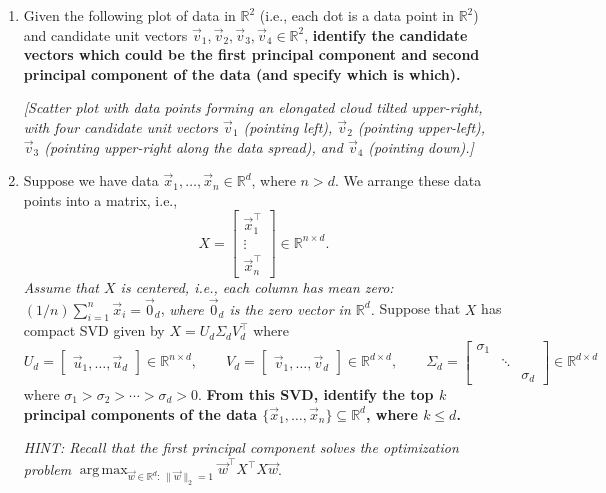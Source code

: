 \documentclass[10pt]{article}
\newcommand{\RR}{\mathbb{R}}
\DeclareMathOperator*{\argmax}{arg\,max}
\begin{document}
\begin{enumerate}[label=(\alph*)]
\item Given the following plot of data in $\RR^2$ (i.e., each dot is a data point in $\RR^2$) and candidate unit vectors $\vec{v}_1, \vec{v}_2, \vec{v}_3, \vec{v}_4 \in \RR^2$, \textbf{identify the candidate vectors which could be the first principal component and second principal component of the data (and specify which is which).}

\begin{center}
\emph{[Scatter plot with data points forming an elongated cloud tilted upper-right, with four candidate unit vectors $\vec{v}_1$ (pointing left), $\vec{v}_2$ (pointing upper-left), $\vec{v}_3$ (pointing upper-right along the data spread), and $\vec{v}_4$ (pointing down).]}
\end{center}

\vspace{6cm}

\item Suppose we have data $\vec{x}_1, \ldots, \vec{x}_n \in \RR^d$, where $n > d$. We arrange these data points into a matrix, i.e.,
\begin{equation}
X = \begin{bmatrix} \vec{x}_1^\top \\ \vdots \\ \vec{x}_n^\top \end{bmatrix} \in \RR^{n \times d}.
\end{equation}
\emph{Assume that $X$ is centered, i.e., each column has mean zero:} $(1/n) \sum_{i=1}^{n} \vec{x}_i = \vec{0}_d$, \emph{where $\vec{0}_d$ is the zero vector in $\RR^d$.} Suppose that $X$ has compact SVD given by $X = U_d \Sigma_d V_d^\top$ where
\begin{equation}
U_d = \begin{bmatrix} \vec{u}_1, \ldots, \vec{u}_d \end{bmatrix} \in \RR^{n \times d}, \qquad V_d = \begin{bmatrix} \vec{v}_1, \ldots, \vec{v}_d \end{bmatrix} \in \RR^{d \times d}, \qquad \Sigma_d = \begin{bmatrix} \sigma_1 & & \\ & \ddots & \\ & & \sigma_d \end{bmatrix} \in \RR^{d \times d}
\end{equation}
where $\sigma_1 > \sigma_2 > \cdots > \sigma_d > 0$. \textbf{From this SVD, identify the top $k$ principal components of the data $\{\vec{x}_1, \ldots, \vec{x}_n\} \subseteq \RR^d$, where $k \leq d$.}

\emph{HINT: Recall that the first principal component solves the optimization problem} $\displaystyle\argmax_{\vec{w} \in \RR^d :\, \|\vec{w}\|_2 = 1} \vec{w}^\top X^\top X \vec{w}$.

\vspace{6cm}

\end{enumerate}
\end{document}

